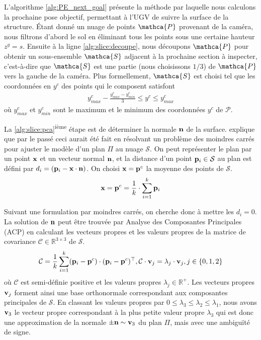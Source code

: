 L'algorithme \ref{alg:PE_next_goal} présente la méthode par laquelle nous calculons la prochaine pose objectif, permettant à l'UGV de suivre la surface de la structure. Étant donné un nuage de points $\mathca{P}$ provenant de la caméra, nous filtrons d'abord le sol en éliminant tous les points sous une certaine hauteur $z^g = s$. Ensuite à la ligne \ref{alg:slice:decoupe}, nous découpons $\mathca{P}$ pour obtenir un sous-ensemble $\mathca{S}$ adjacent à la prochaine section à inspecter, c'est-à-dire que $\mathca{S}$ est une partie (nous choisissons $1/3$) de $\mathca{P}$ vers la gauche de la caméra. Plus formellement, $\mathca{S}$ est choisi tel que les coordonnées en $y^c$ des points qui le composent satisfont
\begin{align}
  y^c_{max} - \frac{y^c_{max} - y^c_{min}}{3} \leq y^c \leq y^c_{max}
\end{align}
où $y^c_{max}$ et $y^c_{min}$ sont le maximum et le minimum des coordonnées $y^c$ de $\mathcal{P}$.

La \ref{alg:slice:pca}\textsuperscript{ième} étape est de déterminer la normale $\mathbf{n}$ de la surface. \citep{Rusu2009} explique que par le passé ceci aurait été fait en résolvant un problème des moindres carrés pour ajuster le modèle d'un plan $\Pi$ au nuage $\mathcal{S}$. On peut représenter le plan par un point $\mathbf{x}$ et un vecteur normal $\mathbf{n}$, et la distance d'un point $\mathbf{p}_i \in \mathcal{S}$ au plan est défini par $d_i = (\mathbf{p}_i - \mathbf{x} \cdot \mathbf{n})$. On choisi $\mathbf{x} = \mathbf{p}^c$ la moyenne des points de $\mathcal{S}$.
\begin{align}
  \mathbf{x} = \mathbf{p}^c = \frac{1}{k} \cdot \sum^{k}_{i=1} \mathbf{p}_i
\end{align}

Suivant une formulation par moindres carrés, on cherche donc à mettre les $d_i = 0$. La solution de $\mathbf{n}$ peut être trouvée par Analyse des Composantes Principales (ACP) en calculant les vecteurs propres et les valeurs propres de la matrice de covariance $\mathcal{C} \in \mathbb{R}^{3\times 3}$ de $\mathcal{S}$.
\begin{align}
  \mathcal{C} = \frac{1}{k} \sum^{k}_{i=1} (\mathbf{p}_i - \mathbf{p}^c) \cdot (\mathbf{p}_i - \mathbf{p}^c)^\top, \mathcal{C} \cdot \mathbf{v}_j = \lambda_j \cdot \mathbf{v}_j, j \in \{0, 1, 2\}
\end{align}
où $\mathcal{C}$ est semi-définie positive et les valeurs propres $\lambda_j \in \mathbb{R}^+$. Les vecteurs propres $\mathbf{v}_j$ forment ainsi une base orthonormale correspondant aux composantes principales de $\mathcal{S}$. En classant les valeurs propres par $0 \leq \lambda_3 \leq \lambda_2 \leq \lambda_1$, nous avons $\mathbf{v}_3$ le vecteur propre correspondant à la plus petite valeur propre $\lambda_3$ qui est donc une approximation de la normale $\pm \mathbf{n} \sim \mathbf{v}_{3}$ du plan $\Pi$, mais avec une ambiguïté de signe.

